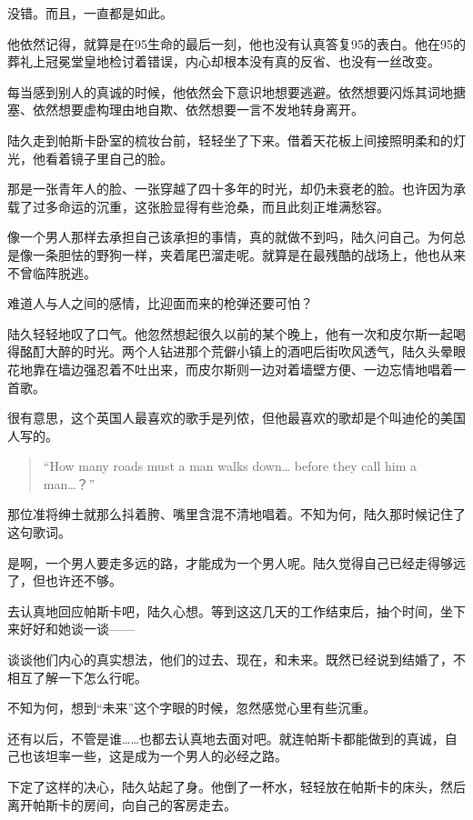 没错。而且，一直都是如此。

他依然记得，就算是在95生命的最后一刻，他也没有认真答复95的表白。他在95的葬礼上冠冕堂皇地检讨着错误，内心却根本没有真的反省、也没有一丝改变。

每当感到别人的真诚的时候，他依然会下意识地想要逃避。依然想要闪烁其词地搪塞、依然想要虚构理由地自欺、依然想要一言不发地转身离开。

陆久走到帕斯卡卧室的梳妆台前，轻轻坐了下来。借着天花板上间接照明柔和的灯光，他看着镜子里自己的脸。

那是一张青年人的脸、一张穿越了四十多年的时光，却仍未衰老的脸。也许因为承载了过多命运的沉重，这张脸显得有些沧桑，而且此刻正堆满愁容。

像一个男人那样去承担自己该承担的事情，真的就做不到吗，陆久问自己。为何总是像一条胆怯的野狗一样，夹着尾巴溜走呢。就算是在最残酷的战场上，他也从来不曾临阵脱逃。

难道人与人之间的感情，比迎面而来的枪弹还要可怕？

陆久轻轻地叹了口气。他忽然想起很久以前的某个晚上，他有一次和皮尔斯一起喝得酩酊大醉的时光。两个人钻进那个荒僻小镇上的酒吧后街吹风透气，陆久头晕眼花地靠在墙边强忍着不吐出来，而皮尔斯则一边对着墙壁方便、一边忘情地唱着一首歌。

很有意思，这个英国人最喜欢的歌手是列侬，但他最喜欢的歌却是个叫迪伦的美国人写的。
\begin{verse}
“How many roads must a man walks down… before they call him a man…？”
\end{verse}

那位准将绅士就那么抖着胯、嘴里含混不清地唱着。不知为何，陆久那时候记住了这句歌词。

是啊，一个男人要走多远的路，才能成为一个男人呢。陆久觉得自己已经走得够远了，但也许还不够。

去认真地回应帕斯卡吧，陆久心想。等到这这几天的工作结束后，抽个时间，坐下来好好和她谈一谈——

谈谈他们内心的真实想法，他们的过去、现在，和未来。既然已经说到结婚了，不相互了解一下怎么行呢。

不知为何，想到“未来”这个字眼的时候，忽然感觉心里有些沉重。

还有以后，不管是谁……也都去认真地去面对吧。就连帕斯卡都能做到的真诚，自己也该坦率一些，这是成为一个男人的必经之路。

下定了这样的决心，陆久站起了身。他倒了一杯水，轻轻放在帕斯卡的床头，然后离开帕斯卡的房间，向自己的客房走去。

\section*{}

